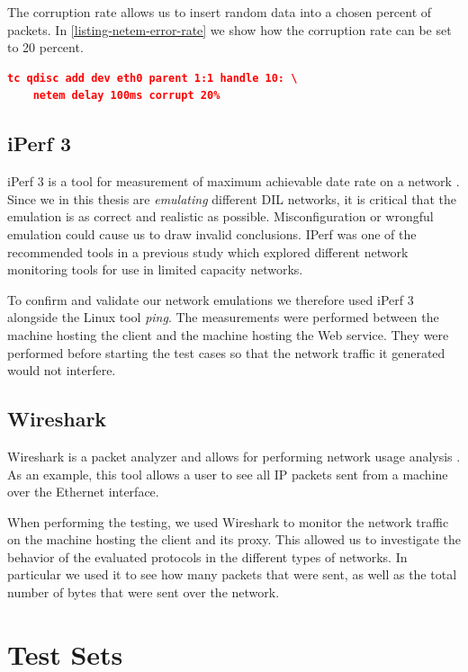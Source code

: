 The corruption rate allows us to insert random data into a chosen percent of
packets. In \cref{listing-netem-error-rate} we show how the corruption rate can
be set to 20 percent.

\begin{lstlisting}[frame=single, language=json, caption="Emulating the corruption rate", label=listing-netem-error-rate]
  tc qdisc add dev eth0 parent 1:1 handle 10: \
    netem delay 100ms corrupt 20%
\end{lstlisting}


\subsection{iPerf 3}

iPerf 3 is a tool for measurement of maximum achievable date rate on a network
\cite{iperf3-homepage}. Since we in this thesis are \textit{emulating} different
DIL networks, it is critical that the emulation is as correct and realistic as
possible. Misconfiguration or wrongful emulation could cause us to draw invalid
conclusions. IPerf was one of the recommended tools in a previous study which
explored different network monitoring tools for use in limited capacity
networks.

To confirm and validate our network emulations we therefore used iPerf 3
alongside the Linux tool \textit{ping}. The measurements were performed between
the machine hosting the client and the machine hosting the Web service. They
were performed before starting the test cases so that the network traffic it
generated would not interfere.


\subsection{Wireshark}

Wireshark is a packet analyzer and allows for performing network usage analysis
\cite{wireshark-homepage}. As an example, this tool allows a user to see all IP
packets sent from a machine over the Ethernet interface.

When performing the testing, we used Wireshark to monitor the network traffic on
the machine hosting the client and its proxy. This allowed us to investigate the
behavior of the evaluated protocols in the different types of networks. In
particular we used it to see how many packets that were sent, as well as the
total number of bytes that were sent over the network.


\section{Test Sets}

